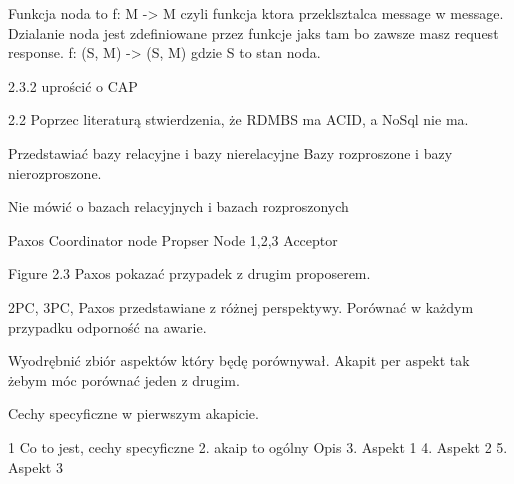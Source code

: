 Funkcja noda to f: M -> M 
czyli funkcja ktora przeklsztalca message w message. 
Dzialanie noda jest zdefiniowane przez funkcje jaks tam bo zawsze masz request response.
f: (S, M) -> (S, M)
gdzie S to stan noda.

2.3.2 uprościć o CAP

2.2
Poprzec literaturą stwierdzenia, że RDMBS ma ACID, a NoSql nie ma.

Przedstawiać bazy relacyjne i bazy nierelacyjne
Bazy rozproszone i bazy nierozproszone.

Nie mówić o bazach relacyjnych i bazach rozproszonych

Paxos
Coordinator node Propser
Node 1,2,3 Acceptor

Figure 2.3 Paxos pokazać przypadek z drugim proposerem.

2PC, 3PC, Paxos przedstawiane z różnej perspektywy.
Porównać w każdym przypadku odporność na awarie.

Wyodrębnić zbiór aspektów który będę porównywał. 
Akapit per aspekt tak żebym móc porównać jeden z drugim.

Cechy specyficzne w pierwszym akapicie.

1 Co to jest, cechy specyficzne
2. akaip to ogólny Opis
3. Aspekt 1
4. Aspekt 2
5. Aspekt 3


